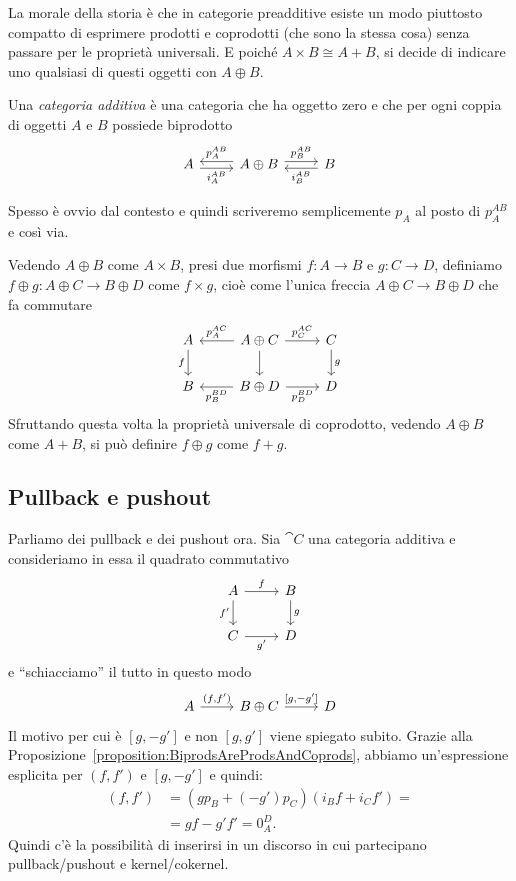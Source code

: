 La morale della storia è che in categorie preadditive esiste un modo
piuttosto compatto di esprimere prodotti e coprodotti (che sono la
stessa cosa) senza passare per le proprietà universali. E poiché
\(A \times B \cong A + B\), si decide di indicare uno qualsiasi di
questi oggetti con \(A \oplus B\).

\begin{definition}
  Una {\em categoria additiva} è una categoria che ha oggetto zero e che
  per ogni coppia di oggetti \(A\) e \(B\) possiede biprodotto
  \[
    \begin{tikzcd}
      A \ar["{i_A^{AB}}", r, shift right, swap] & A \oplus B
      \ar["{p_A^{AB}}", l, shift right, swap] \ar["{p_B^{AB}}", r, shift
      left] & B \ar["{i_B^{AB}}", l, shift left]
    \end{tikzcd}
  \]
\end{definition}

Spesso è ovvio dal contesto e quindi scriveremo semplicemente \(p_A\) al
posto di \(p_A^{AB}\) e così via.

Vedendo \(A \oplus B\) come \(A \times B\), presi due morfismi
\(f : A \to B\) e \(g : C \to D\), definiamo
\(f \oplus g : A \oplus C \to B \oplus D\) come \(f \times g\), cioè
come l'unica freccia \(A \oplus C \to B \oplus D\) che fa commutare
\[
  \begin{tikzcd}
    A \ar["{f}", d, swap] & A \oplus C \ar["{p_A^{AC}}", l, swap]
    \ar["{}", d] \ar["{p_C^{AC}}", r] & C \ar["{g}", d] \\
    B & B \oplus D \ar["{p_B^{BD}}", l] \ar["{p_D^{BD}}", r, swap] & D
  \end{tikzcd}
\]
Sfruttando questa volta la proprietà universale di coprodotto, vedendo
\(A \oplus B\) come \(A + B\), si può definire \(f \oplus g\) come
\(f + g\).


\subsection{Pullback e pushout}

Parliamo dei pullback e dei pushout ora. Sia \(\cat C\) una categoria
additiva e consideriamo in essa il quadrato commutativo
\[
  \begin{tikzcd}
    A \ar["{f}", r] \ar["{f'}", d, swap] & B \ar["{g}", d] \\
    C \ar["{g'}", r, swap] & D
  \end{tikzcd}
\]
e ``schiacciamo'' il tutto in questo modo
\[
  \begin{tikzcd}
    A \ar["{(f, f')}", r] & B \oplus C \ar["{[g, -g']}", r] & D
  \end{tikzcd}
\]
Il motivo per cui è \([g, -g']\) e non \([g, g']\) viene spiegato
subito. Grazie alla
Proposizione~\ref{proposition:BiprodsAreProdsAndCoprods}, abbiamo
un'espressione esplicita per \((f,f')\) e \([g,-g']\) e quindi:
\begin{align*} [g, -g'] (f, f') &= (g p_B + (-g') p_C) (i_B f + i_C f') = \\
                                &= g f - g' f' = 0_A^D .
\end{align*}
Quindi c'è la possibilità di inserirsi in un discorso in cui partecipano
pullback/pushout e kernel/cokernel.


